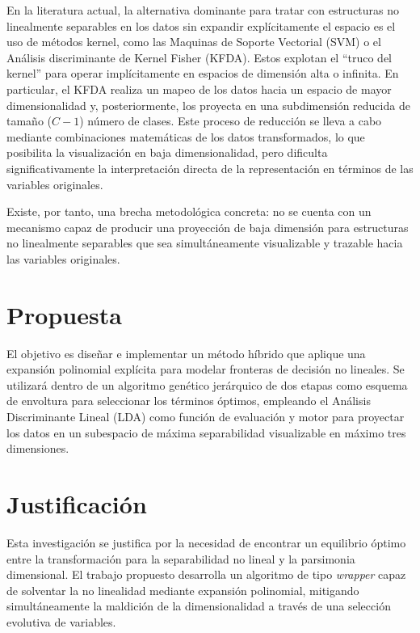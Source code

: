 En la literatura actual, la alternativa dominante para tratar con estructuras no linealmente separables en los datos sin expandir explícitamente el espacio es el uso de métodos kernel, como las Maquinas de Soporte Vectorial (SVM) o el Análisis discriminante de Kernel Fisher (KFDA). Estos explotan el ``truco del kernel'' para operar implícitamente en espacios de dimensión alta o infinita. En particular, el KFDA realiza un mapeo de los datos hacia un espacio de mayor dimensionalidad y, posteriormente, los proyecta en una subdimensión reducida de tamaño  ($C - 1$) número de clases. Este proceso de reducción se lleva a cabo mediante combinaciones matemáticas de los datos transformados, lo que posibilita la visualización en baja dimensionalidad, pero dificulta significativamente la interpretación directa de la representación en términos de las variables originales. 

Existe, por tanto, una brecha metodológica concreta: no se cuenta con un mecanismo capaz de producir una proyección de baja dimensión para estructuras no linealmente separables que sea simultáneamente visualizable y trazable hacia las variables originales. 

\section{Propuesta}

El objetivo es diseñar e implementar un método híbrido que aplique una expansión polinomial explícita para modelar fronteras de decisión no lineales. Se utilizará dentro de un algoritmo genético jerárquico de dos etapas como esquema de envoltura para seleccionar los términos óptimos, empleando el Análisis Discriminante Lineal (LDA) como función de evaluación y motor para proyectar los datos en un subespacio de máxima separabilidad visualizable en máximo tres dimensiones.

\section{Justificación}
\label{sec:Justificacion}

Esta investigación se justifica por la necesidad de encontrar un equilibrio óptimo entre la transformación para la separabilidad no lineal y la parsimonia dimensional. El trabajo propuesto desarrolla un algoritmo de tipo \textit{wrapper} capaz de solventar la no linealidad mediante expansión polinomial, mitigando simultáneamente la maldición de la dimensionalidad a través de una selección evolutiva de variables.

